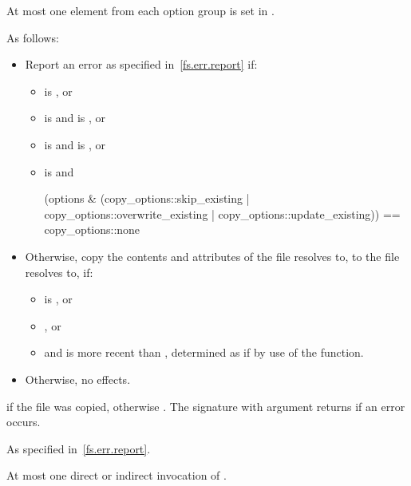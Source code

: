 \begin{itemdescr}
\pnum
\requires At most one element from each
  option group is set
  in .

\pnum
\effects
As follows:
\begin{itemize}
\item
Report an error as specified in~\ref{fs.err.report} if:
\begin{itemize}
\item {} is , or
\item {} is  and  is , or
\item {} is  and  is , or
\item {} is  and
\begin{codeblock}
(options & (copy_options::skip_existing |
            copy_options::overwrite_existing |
            copy_options::update_existing)) == copy_options::none
\end{codeblock}
\end{itemize}

\item
Otherwise, copy the contents and attributes of the file 
    resolves to, to the file  resolves to, if:
\begin{itemize}
\item {} is , or
\item {}, or
\item {} and 
      is more recent than , determined as if by use of the  function.
\end{itemize}

\item
Otherwise, no effects.
\end{itemize}

\pnum
\returns {} if the  file
  was copied, otherwise . The signature with argument  returns
   if an error occurs.

\pnum
\throws As specified in~\ref{fs.err.report}.

\pnum
\complexity At most one direct or indirect invocation of .
\end{itemdescr}

